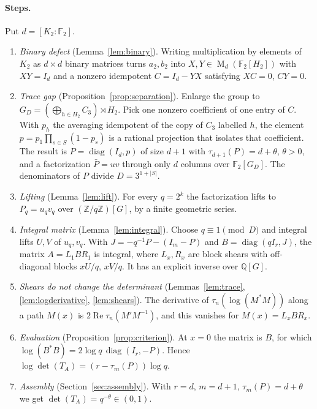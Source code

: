 \documentclass[11pt]{article}
\theoremstyle{remark}
\numberwithin{equation}{section}
\newcommand{\F}{\mathbb F}
\newcommand{\Z}{\mathbb Z}
\newcommand{\Q}{\mathbb Q}
\newcommand{\Mat}{\operatorname{M}}
\newcommand{\diag}{\operatorname{diag}}
\begin{document}
\paragraph{Steps.}
Put $d=[K_2:\F_2]$.
\begin{enumerate}[label=(\arabic*),leftmargin=2.2em]
\item \emph{Binary defect} (Lemma~\ref{lem:binary}). Writing multiplication by elements of $K_2$ as $d\times d$ binary matrices turns $a_2,b_2$ into $X,Y\in\Mat_d(\F_2[H_2])$ with $XY=I_d$ and a nonzero idempotent $C=I_d-YX$ satisfying $XC=0$, $CY=0$.
\item \emph{Trace gap} (Proposition~\ref{prop:separation}). Enlarge the group to $G_D=(\bigoplus_{h\in H_2}C_3)\rtimes H_2$. Pick one nonzero coefficient of one entry of $C$. With $p_h$ the averaging idempotent of the copy of $C_3$ labelled $h$, the element $p=p_1\prod_{s\in S}(1-p_s)$ is a rational projection that isolates that coefficient. The result is $P=\diag(I_d,p)$ of size $d+1$ with $\tau_{d+1}(P)=d+\theta$, $\theta>0$, and a factorization $\bar P=uv$ through only $d$ columns over $\F_2[G_D]$. The denominators of $P$ divide $D=3^{1+|S|}$.
\item \emph{Lifting} (Lemma~\ref{lem:lift}). For every $q=2^k$ the factorization lifts to $P_q=u_qv_q$ over $(\Z/q\Z)[G]$, by a finite geometric series.
\item \emph{Integral matrix} (Lemma~\ref{lem:integral}). Choose $q\equiv1\pmod D$ and integral lifts $U,V$ of $u_q,v_q$. With $J=-q^{-1}P-(I_m-P)$ and $B=\diag(qI_r,J)$, the matrix $A=L_1BR_1$ is integral, where $L_x,R_x$ are block shears with off-diagonal blocks $xU/q$, $xV/q$. It has an explicit inverse over $\Q[G]$.
\item \emph{Shears do not change the determinant} (Lemmas~\ref{lem:trace}, \ref{lem:logderivative}, \ref{lem:shears}). The derivative of $\tau_n(\log(M^*M))$ along a path $M(x)$ is $2\operatorname{Re}\tau_n(M'M^{-1})$, and this vanishes for $M(x)=L_xBR_x$.
\item \emph{Evaluation} (Proposition~\ref{prop:criterion}). At $x=0$ the matrix is $B$, for which $\log(B^*B)=2\log q\,\diag(I_r,-P)$. Hence $\log\det(T_A)=(r-\tau_m(P))\log q$.
\item \emph{Assembly} (Section~\ref{sec:assembly}). With $r=d$, $m=d+1$, $\tau_m(P)=d+\theta$ we get $\det(T_A)=q^{-\theta}\in(0,1)$.
\end{enumerate}
\end{document}
